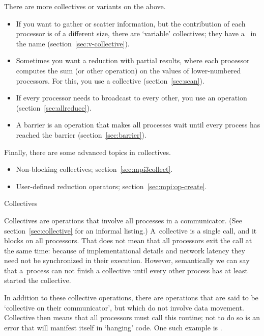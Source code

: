 There are more collectives or variants on the above.
\begin{itemize}
\item If you want to gather or scatter information, but the contribution
  of each processor is of a different size, there are `variable' collectives;
  they have a~ in the name (section~\ref{sec:v-collective}).
\item Sometimes you want a reduction with partial results, where each processor
  computes the sum (or other operation) on the values of lower-numbered processors.
  For this, you use a  collective (section~\ref{sec:scan}).
\item If every processor needs to broadcast to every other, you use an
   operation (section~\ref{sec:allreduce}).
\item A barrier is an operation that makes all processes wait until every
  process has reached the barrier (section~\ref{sec:barrier}).
\end{itemize}

Finally, there are some advanced topics in collectives.
\begin{itemize}
\item Non-blocking collectives; section~\ref{sec:mpi3collect}.
\item User-defined reduction operators; section~\ref{sec:mpi:op-create}.
\end{itemize}


%
 {Collectives}

Collectives are operations that involve all processes in a
communicator. (See section~\ref{sec:collective} for an informal listing.)
A~collective is a
single call, and it blocks on all processors.
That does not mean that
all processors exit the call at the same time: because of
implementational details and network
latency they need not be synchronized in their execution.
However, semantically we can say that
a~process can not finish
a collective until every other process has at least started the collective.

In addition to these collective operations, there are operations that
are said to be `collective on their communicator', but which do not
involve data movement. Collective then means that all processors must
call this routine; not to do so is an error that will 
manifest itself in `hanging' code. One such example is
.

